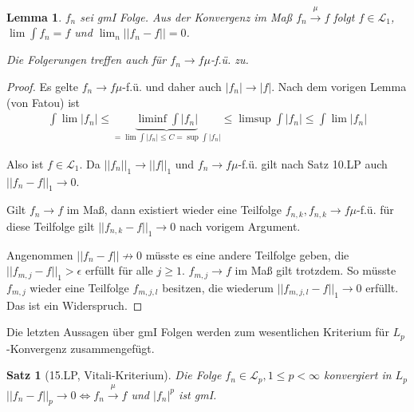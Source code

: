 \documentclass[]{article}
\newtheorem{theorem}{Satz}
\newtheorem{lemma}{Lemma}
\begin{document}
\begin{lemma}
	$f_n$ sei gmI Folge. Aus der Konvergenz im Maß $f_n \xrightarrow{\mu} f$ folgt $f \in \mathcal{L}_1$, $\lim \int f_n = f$ und $\lim_n ||f_n - f|| = 0$.
	
	Die Folgerungen treffen auch für $f_n \rightarrow f \mu$-f.ü. zu.
\end{lemma}

\begin{proof}
	Es gelte $f_n\rightarrow f \mu$-f.ü. und daher auch $|f_n|\rightarrow|f|$. Nach dem vorigen Lemma (von Fatou) ist
	\begin{align*}
		\int \lim |f_n| \leq \underbrace{\liminf\int |f_n|}_{=\lim \int |f_n| \leq C=\sup \int |f_n|} \leq \limsup \int |f_n| \leq \int \lim |f_n|
	\end{align*}

	Also ist $f\in \mathcal{L}_1$. Da $||f_n||_1 \rightarrow ||f||_1$ und $f_n\rightarrow f \mu$-f.ü. gilt nach Satz 10.LP auch $||f_n-f||_1\rightarrow 0$.
	
	Gilt $f_n\rightarrow f$ im Maß, dann existiert wieder eine Teilfolge $f_{n,k}, f_{n,k}\rightarrow f \mu$-f.ü. für diese Teilfolge gilt $||f_{n,k}-f||_1\rightarrow 0$ nach vorigem Argument.
	
	Angenommen $||f_n - f||\nrightarrow 0$ müsste es eine andere Teilfolge geben, die $||f_{m,j}-f||_1>\epsilon$ erfüllt für alle $j\geq 1$. $f_{m,j}\rightarrow f$ im Maß gilt trotzdem. So müsste $f_{m,j}$ wieder eine Teilfolge $f_{m,j,l}$ besitzen, die wiederum $||f_{m,j,l}-f||_1 \rightarrow 0$ erfüllt. Das ist ein Widerspruch.
\end{proof}

Die letzten Aussagen über gmI Folgen werden zum wesentlichen Kriterium für $L_p$-Konvergenz zusammengefügt.

\begin{theorem}[15.LP, Vitali-Kriterium]
	Die Folge $f_n \in \mathcal{L}_p, 1 \leq p < \infty$ konvergiert in $L_p$ $||f_n - f||_p \rightarrow 0 \iff f_n \xrightarrow{\mu} f$ und $|f_n|^p$ ist gmI.
\end{theorem}
\end{document}
